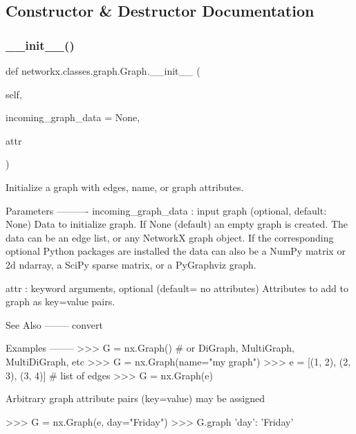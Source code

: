 \subsection{Constructor \& Destructor Documentation}
\mbox{\label{classnetworkx_1_1classes_1_1graph_1_1Graph_ab11a4fd91f4b19fc5d8975a009983e5a}} 
\subsubsection{\texorpdfstring{\+\_\+\+\_\+init\+\_\+\+\_\+()}{\_\_init\_\_()}}
{\footnotesize\ttfamily def networkx.\+classes.\+graph.\+Graph.\+\_\+\+\_\+init\+\_\+\+\_\+ (\begin{DoxyParamCaption}\item[{}]{self,  }\item[{}]{incoming\+\_\+graph\+\_\+data = {\ttfamily None},  }\item[{}]{attr }\end{DoxyParamCaption})}

\begin{DoxyVerb}Initialize a graph with edges, name, or graph attributes.

Parameters
----------
incoming_graph_data : input graph (optional, default: None)
    Data to initialize graph. If None (default) an empty
    graph is created.  The data can be an edge list, or any
    NetworkX graph object.  If the corresponding optional Python
    packages are installed the data can also be a NumPy matrix
    or 2d ndarray, a SciPy sparse matrix, or a PyGraphviz graph.

attr : keyword arguments, optional (default= no attributes)
    Attributes to add to graph as key=value pairs.

See Also
--------
convert

Examples
--------
>>> G = nx.Graph()  # or DiGraph, MultiGraph, MultiDiGraph, etc
>>> G = nx.Graph(name="my graph")
>>> e = [(1, 2), (2, 3), (3, 4)]  # list of edges
>>> G = nx.Graph(e)

Arbitrary graph attribute pairs (key=value) may be assigned

>>> G = nx.Graph(e, day="Friday")
>>> G.graph
{'day': 'Friday'}\end{DoxyVerb}
 

